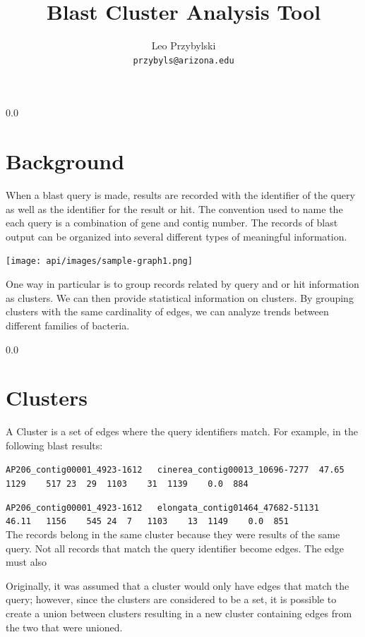 \documentclass[11pt,notitlepage]{article}
\title{Blast Cluster Analysis Tool}
\author{Leo Przybylski\\
\texttt{przybyls@arizona.edu}}
\begin{document}
  \maketitle
  \tableofcontents

  \abstract{\ldots
}
  {\setlength{\baselineskip}%
           {0.0\baselineskip}
  \section*{\hfill Background}
  \hrulefill \par}
  When a blast query is made, results are recorded with the identifier of the query
  as well as the identifier for the result or hit. The convention used to name the
  each query is a combination of gene and contig number. The records of blast output
  can be organized into several different types of meaningful information.


  \texttt{[image: api/images/sample-graph1.png]}

  One way in particular is to group records related by query and or hit information as
  clusters. We can then provide statistical information on clusters. By grouping clusters
  with the same cardinality of edges, we can analyze trends between different families
  of bacteria.  

  {\setlength{\baselineskip}%
           {0.0\baselineskip}
  \section*{\hfill Clusters}
  \hrulefill \par}
  A Cluster is a set of edges where the query identifiers match. For example, in the
  following blast results:

  \noindent \verb|AP206_contig00001_4923-1612	cinerea_contig00013_10696-7277	47.65	1129	517	23	29	1103	31	1139	0.0	 884|

  \noindent \verb|AP206_contig00001_4923-1612	elongata_contig01464_47682-51131	46.11	1156	545	24	7	1103	13	1149	0.0	 851|
  \\

  The records belong in the same cluster because they were results of the same query. Not
  all records that match the query identifier become edges. The edge must also


  Originally,
  it was assumed that a cluster would only have edges that match the query; however, since
  the clusters are considered to be a set, it is possible to create a union between clusters 
  resulting in a new cluster containing edges from the two that were unioned.
\end{document}
